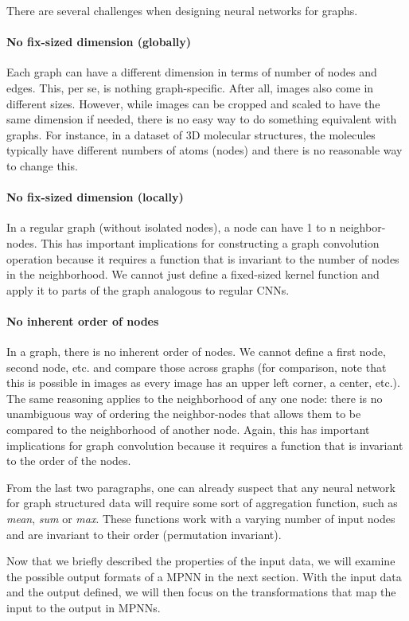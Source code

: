 There are several challenges when designing neural networks for graphs.

\paragraph{No fix-sized dimension (globally)}
\noindent Each graph can have a different dimension in terms of number of nodes and edges. This, per se, is nothing graph-specific. After all, images also come in different sizes. However, while images can be cropped and scaled to have the same dimension if needed, there is no easy way to do something equivalent with graphs. For instance, in a dataset of 3D molecular structures, the molecules typically have different numbers of atoms (nodes) and there is no reasonable way to change this.
\paragraph{No fix-sized dimension (locally)}
\noindent In a regular graph (without isolated nodes), a node can have 1 to n neighbor-nodes. This has important implications for constructing a graph convolution operation because it requires a function that is invariant to the number of nodes in the neighborhood. We cannot just define a fixed-sized kernel function and apply it to parts of the graph analogous to regular CNNs.
\paragraph{No inherent order of nodes}
\noindent In a graph, there is no inherent order of nodes. We cannot define a first node, second node, etc. and compare those across graphs (for comparison, note that this is possible in images as every image has an upper left corner, a center, etc.). The same reasoning applies to the neighborhood of any one node: there is no unambiguous way of ordering the neighbor-nodes that allows them to be compared to the neighborhood of another node. Again, this has important implications for graph convolution because it requires a function that is invariant to the order of the nodes.

From the last two paragraphs, one can already suspect that any neural network for graph structured data will require some sort of aggregation function, such as \textit{mean}, \textit{sum} or  \textit{max}. These functions work with a varying number of input nodes and are invariant to their order (permutation invariant).

Now that we briefly described the properties of the input data, we will examine the possible output formats of a MPNN in the next section. With the input data and the output defined, we will then focus on the transformations that map the input to the output in MPNNs.

